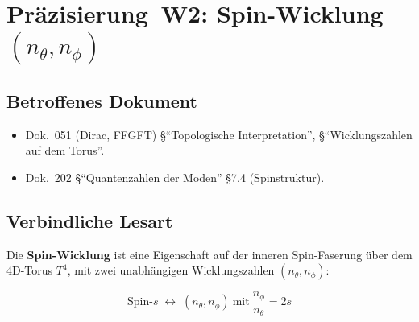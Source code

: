 \section{\texorpdfstring{Präzisierung~W2: Spin-Wicklung $(n_\theta, n_\phi)$}{Praezisierung W2: Spin-Wicklung}}

\subsection*{Betroffenes Dokument}

\begin{itemize}
  \item Dok.~051 (Dirac, FFGFT) §\enquote{Topologische
        Interpretation}, §\enquote{Wicklungszahlen auf dem Torus}.
  \item Dok.~202 §\enquote{Quantenzahlen der Moden} \S 7.4
        (Spinstruktur).
\end{itemize}

\subsection*{Verbindliche Lesart}

Die \textbf{Spin-Wicklung} ist eine Eigenschaft auf der inneren
Spin-Faserung über dem 4D-Torus $T^4$, mit zwei unabhängigen
Wicklungszahlen $(n_\theta, n_\phi)$:

\begin{equation}
  \text{Spin-}s \;\longleftrightarrow\;
  (n_\theta, n_\phi)\ \text{mit}\ \frac{n_\phi}{n_\theta} = 2s
  \tag{210.2}
\end{equation}

\begin{center}
{\footnotesize
{}
}
\end{center}

